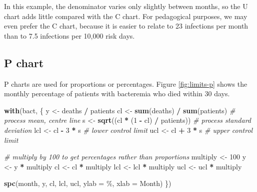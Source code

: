 \documentclass[
]{book}
\newenvironment{Shaded}{\begin{snugshade}}{\end{snugshade}}
\newcommand{\AttributeTok}[1]{\textcolor[rgb]{0.13,0.29,0.53}{#1}}
\newcommand{\CommentTok}[1]{\textcolor[rgb]{0.56,0.35,0.01}{\textit{#1}}}
\newcommand{\DecValTok}[1]{\textcolor[rgb]{0.00,0.00,0.81}{#1}}
\newcommand{\FunctionTok}[1]{\textcolor[rgb]{0.13,0.29,0.53}{\textbf{#1}}}
\newcommand{\NormalTok}[1]{#1}
\newcommand{\OtherTok}[1]{\textcolor[rgb]{0.56,0.35,0.01}{#1}}
\newcommand{\SpecialCharTok}[1]{\textcolor[rgb]{0.81,0.36,0.00}{\textbf{#1}}}
\newcommand{\StringTok}[1]{\textcolor[rgb]{0.31,0.60,0.02}{#1}}
\begin{document}
In this example, the denominator varies only slightly between months, so the U chart adds little compared with the C chart. For pedagogical purposes, we may even prefer the C chart, because it is easier to relate to 23 infections per month than to 7.5 infections per 10,000 risk days.

\subsection{P chart}\label{p-chart}

P charts are used for proportions or percentages. Figure \ref{fig:limits-p} shows the monthly percentage of patients with bacteremia who died within 30 days.

\begin{Shaded}
\begin{Highlighting}[]
\FunctionTok{with}\NormalTok{(bact, \{}
\NormalTok{  y   }\OtherTok{\textless{}{-}}\NormalTok{ deaths }\SpecialCharTok{/}\NormalTok{ patients}
\NormalTok{  cl  }\OtherTok{\textless{}{-}} \FunctionTok{sum}\NormalTok{(deaths) }\SpecialCharTok{/} \FunctionTok{sum}\NormalTok{(patients)      }\CommentTok{\# process mean, centre line}
\NormalTok{  s   }\OtherTok{\textless{}{-}} \FunctionTok{sqrt}\NormalTok{((cl }\SpecialCharTok{*}\NormalTok{ (}\DecValTok{1} \SpecialCharTok{{-}}\NormalTok{ cl) }\SpecialCharTok{/}\NormalTok{ patients)) }\CommentTok{\# process standard deviation}
\NormalTok{  lcl }\OtherTok{\textless{}{-}}\NormalTok{ cl }\SpecialCharTok{{-}} \DecValTok{3} \SpecialCharTok{*}\NormalTok{ s                       }\CommentTok{\# lower control limit}
\NormalTok{  ucl }\OtherTok{\textless{}{-}}\NormalTok{ cl }\SpecialCharTok{+} \DecValTok{3} \SpecialCharTok{*}\NormalTok{ s                       }\CommentTok{\# upper control limit}
  
  \CommentTok{\# multiply by 100 to get percentages rather than proportions}
\NormalTok{  multiply }\OtherTok{\textless{}{-}} \DecValTok{100}
\NormalTok{  y        }\OtherTok{\textless{}{-}}\NormalTok{ y }\SpecialCharTok{*}\NormalTok{ multiply}
\NormalTok{  cl       }\OtherTok{\textless{}{-}}\NormalTok{ cl }\SpecialCharTok{*}\NormalTok{ multiply}
\NormalTok{  lcl      }\OtherTok{\textless{}{-}}\NormalTok{ lcl }\SpecialCharTok{*}\NormalTok{ multiply}
\NormalTok{  ucl      }\OtherTok{\textless{}{-}}\NormalTok{ ucl }\SpecialCharTok{*}\NormalTok{ multiply}
  
  \FunctionTok{spc}\NormalTok{(month, y, cl, lcl, ucl, }
      \AttributeTok{ylab =} \StringTok{\textquotesingle{}\%\textquotesingle{}}\NormalTok{, }
      \AttributeTok{xlab =} \StringTok{\textquotesingle{}Month\textquotesingle{}}\NormalTok{)}
\NormalTok{\})}
\end{Highlighting}
\end{Shaded}
\end{document}
